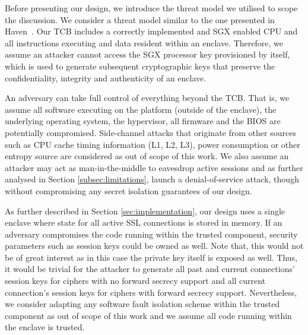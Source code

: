\documentclass[../main.tex]{subfiles}
\begin{document}
Before presenting our design, we introduce the threat model we
utilised to scope the discussion. We consider a threat model similar
to the one presented in Haven~\cite{Baumann14}. Our TCB includes a
correctly implemented and SGX enabled CPU and all instructions
executing and data resident within an enclave. Therefore, we assume an
attacker cannot access the SGX processor key provisioned by \Intel
itself, which is used to generate subsequent cryptographic keys that
preserve the confidentiality, integrity and authenticity of an
enclave.

An adversary can take full control of everything beyond the TCB. That
is, we assume all software executing on the platform (outside of the
enclave), the underlying operating system, the hypervisor, all
firmware and the BIOS are potentially compromised. Side-channel
attacks that originate from other sources such as CPU cache timing
information (L1, L2, L3), power consumption or other entropy source
are considered as out of scope of this work. We also assume an
attacker may act as man-in-the-middle to eavesdrop active sessions
and as further analysed in Section \ref{subsec:limitations}, launch
a denial-of-service attack, though without compromising any secret
isolation guarantees of our design.

As further described in Section \ref{sec:implementation}, our design
uses a single enclave where state for all active SSL connections is
stored in memory. If an adversary compromises the code running within
the trusted component, security parameters such as session keys could
be owned as well. Note that, this would not be of great interest as
in this case the private key itself is exposed as well. Thus, it
would be trivial for the attacker to generate all past and current
connections' session keys for ciphers with no forward secrecy support
and all current connection's session keys for ciphers with forward
secrecy support. Nevertheless, we consider adapting any software
fault isolation scheme within the trusted component as out of scope
of this work and we assume all code running within the enclave is
trusted.
\end{document}
